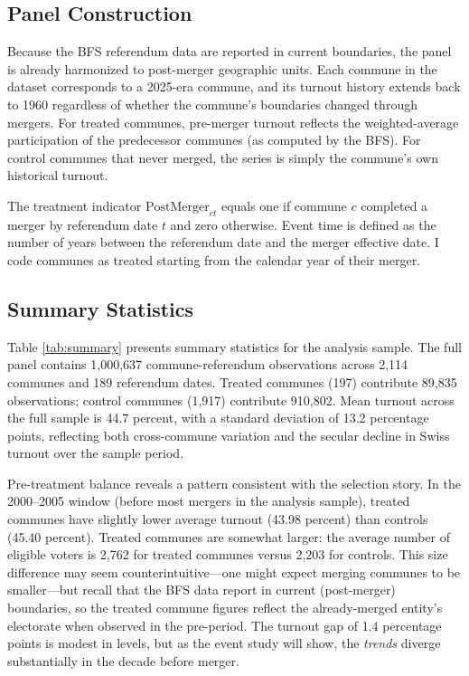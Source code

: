 \documentclass[12pt]{article}
\begin{document}
\subsection{Panel Construction}

Because the BFS referendum data are reported in current boundaries, the panel is already harmonized to post-merger geographic units. Each commune in the dataset corresponds to a 2025-era commune, and its turnout history extends back to 1960 regardless of whether the commune's boundaries changed through mergers. For treated communes, pre-merger turnout reflects the weighted-average participation of the predecessor communes (as computed by the BFS). For control communes that never merged, the series is simply the commune's own historical turnout.

The treatment indicator $\text{PostMerger}_{ct}$ equals one if commune $c$ completed a merger by referendum date $t$ and zero otherwise. Event time is defined as the number of years between the referendum date and the merger effective date. I code communes as treated starting from the calendar year of their merger.

\subsection{Summary Statistics}



Table \ref{tab:summary} presents summary statistics for the analysis sample. The full panel contains 1,000,637 commune-referendum observations across 2,114 communes and 189 referendum dates. Treated communes (197) contribute 89,835 observations; control communes (1,917) contribute 910,802. Mean turnout across the full sample is 44.7 percent, with a standard deviation of 13.2 percentage points, reflecting both cross-commune variation and the secular decline in Swiss turnout over the sample period.

Pre-treatment balance reveals a pattern consistent with the selection story. In the 2000--2005 window (before most mergers in the analysis sample), treated communes have slightly lower average turnout (43.98 percent) than controls (45.40 percent). Treated communes are somewhat larger: the average number of eligible voters is 2,762 for treated communes versus 2,203 for controls. This size difference may seem counterintuitive---one might expect merging communes to be smaller---but recall that the BFS data report in current (post-merger) boundaries, so the treated commune figures reflect the already-merged entity's electorate when observed in the pre-period. The turnout gap of 1.4 percentage points is modest in levels, but as the event study will show, the \textit{trends} diverge substantially in the decade before merger.
\end{document}

